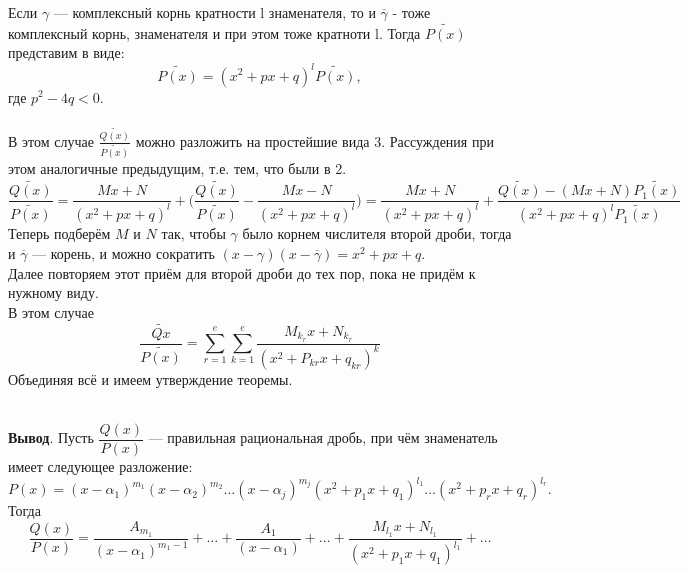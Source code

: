 \begin{Proof}
\begin{enumerate}
		Если $ \gamma $ --- комплексный корнь кратности l знаменателя, то и $ \overline{\gamma} $ - тоже комплексный корнь, знаменателя и при этом тоже кратноти l. Тогда $ \widetilde{P(x)} $ представим в виде: 
		$$ \widetilde{P(x)} = (x^2 + px + q)^l \widetilde{P(x)}, $$ где $ p^2 - 4q < 0 $.\\\\
		В этом случае $ \frac{\widetilde{Q(x)}}{\widetilde{P(x)}} $ можно разложить на простейшие вида 3. Рассуждения при этом аналогичные предыдущим, т.е. тем, что были в 2.
		$$ \frac{\widetilde{Q(x)}}{\widetilde{P(x)}} = \frac{Mx + N}{(x^2 + px + q)^l} + \Big(\frac{\widetilde{Q(x)}}{\widetilde{P(x)}} - \frac{Mx - N}{(x^2 + px + q)^l} \Big) = \frac{Mx + N}{(x^2 + px + q)^l} + \frac{\widetilde{Q(x)} - (Mx + N) \widetilde{P_1(x)}}{(x^2 + px +q)^l \widetilde{P_1(x)}} $$
		Теперь подберём $M$ и $N$ так, чтобы $ \gamma $ было корнем числителя второй дроби, тогда и $ \overline{\gamma}$ --- корень, и можно сократить $ (x -  \gamma)(x - \overline{\gamma}) = x^2 + px + q $.\\
		Далее повторяем этот приём для второй дроби до тех пор, пока не придём к нужному виду. \\
		В этом случае $$ \frac{\widetilde{Q{x}}}{\widetilde{P(x)}} = \sum\limits_{r = 1}^{e} \sum\limits_{k = 1}^{e} \frac{M_{k_{r}}x + N_{k_{r}}}{(x^2 + P_{kr}x + q_{kr})^k}$$
		Объединяя всё и имеем утверждение теоремы.
	\end{enumerate} 
\end{Proof}\\
\textbf{Вывод}.
Пусть $ \dfrac{Q(x)}{P(x)} $ --- правильная рациональная дробь, при чём знаменатель имеет следующее разложение:
$$ P(x) = (x - \alpha_1)^{m_1} (x - \alpha_2)^{m_2}\ldots(x - \alpha_j)^{m_j} (x^2 + p_1x + q_1)^{l_1} \ldots (x^2 + p_rx + q_r)^{l_r}.$$
Тогда $$ \frac{Q(x)}{P(x)} = \frac{A_{m_1}}{(x - \alpha_1)^{m_1 - 1}} + \ldots + \frac{A_1}{(x - \alpha_1)} + \ldots + \frac{M_{l_1}x + N_{l_1}}{(x^2 + p_1x + q_1)^{l_1}} + \ldots$$
